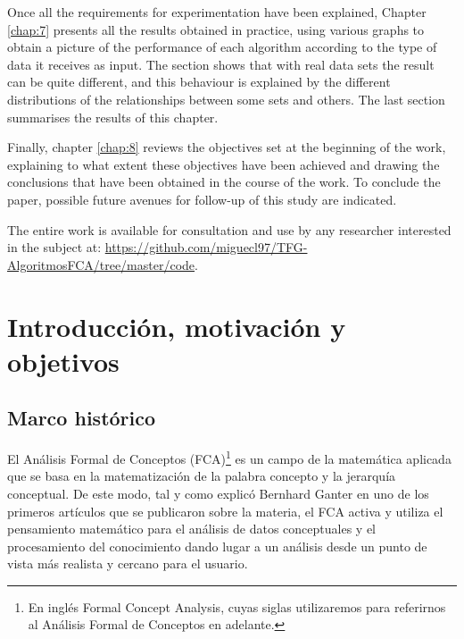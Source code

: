 \documentclass[oneside,openright,titlepage,numbers=noenddot,openany,headinclude,footinclude=true,
cleardoublepage=empty,abstractoff,BCOR=5mm,paper=a4,fontsize=12pt,main=spanish]{scrreprt}
\begin{document}
Once all the requirements for experimentation have been explained, Chapter \ref{chap:7} presents all the results obtained in practice, using various graphs to obtain a picture of the performance of each algorithm according to the type of data it receives as input. The section shows that with real data sets the result can be quite different, and this behaviour is explained by the different distributions of the relationships between some sets and others. The last section summarises the results of this chapter.


Finally, chapter \ref{chap:8} reviews the objectives set at the beginning of the work, explaining to what extent these objectives have been achieved and drawing the conclusions that have been obtained in the course of the work. To conclude the paper, possible future avenues for follow-up of this study are indicated.

The entire work is available for consultation and use by any researcher interested in the subject at:
\href{https://github.com/miguecl97/TFG-AlgoritmosFCA/tree/master/code}{https://github.com/miguecl97/TFG-AlgoritmosFCA/tree/master/code}.




\newpage
\tableofcontents


\listoffigures
\listoftables

\chapter{Introducción, motivación y objetivos}
\label{chap:1}
\section{Marco histórico}
El Análisis Formal de Conceptos (FCA)\footnote{En inglés Formal Concept Analysis, cuyas siglas utilizaremos para referirnos al Análisis Formal de Conceptos en adelante.} es un campo de la matemática aplicada que se basa en la matematización de la palabra concepto y la jerarquía conceptual. De este modo, tal y como explicó Bernhard Ganter \cite{ganter_formal_1999} en uno de los primeros artículos que se publicaron sobre la materia, el FCA activa y utiliza el pensamiento matemático para el análisis de datos conceptuales y el procesamiento del conocimiento dando lugar a un análisis desde un punto de vista más realista y cercano para el usuario.
\end{document}
